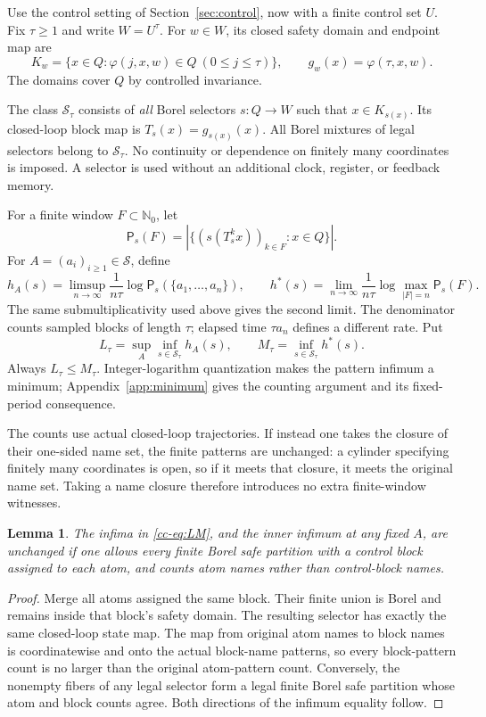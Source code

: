 \documentclass[11pt,reqno]{amsart}
\numberwithin{equation}{section}
\newtheorem{lemma}[theorem]{Lemma}
\theoremstyle{definition}
\newcommand{\Nzero}{\mathbb N_0}
\newcommand{\Patt}{\mathsf P}
\newcommand{\hpat}{h^{*}}
\newcommand{\Ssafe}{\mathcal S}
\begin{document}
Use the control setting of Section~\ref{sec:control}, now with a
finite control set $U$. Fix $\tau\ge1$ and write $W=U^\tau$.
For $w\in W$, its closed safety domain and endpoint map are
\begin{equation}\label{cc-eq:safe}
 K_w=\{x\in Q:\varphi(j,x,w)\in Q\ (0\le j\le\tau)\},
 \qquad g_w(x)=\varphi(\tau,x,w).
\end{equation}
The domains cover $Q$ by controlled invariance.

The class $\Ssafe_\tau$ consists of \emph{all} Borel selectors $s:Q\to W$
such that $x\in K_{s(x)}$. Its closed-loop block map is
$T_s(x)=g_{s(x)}(x)$. All Borel mixtures of legal selectors belong to
$\Ssafe_\tau$. No continuity or dependence on finitely many coordinates
is imposed. A selector is used without an additional clock, register,
or feedback memory.

For a finite window $F\subset\Nzero$, let
\[
 \Patt_s(F)=\left|\{(s(T_s^k x))_{k\in F}:x\in Q\}\right|.
\]
For $A=(a_i)_{i\ge1}\in\mathscr S$, define
\[
 h_A(s)=\limsup_{n\to\infty}\frac{1}{n\tau}
       \log\Patt_s(\{a_1,\ldots,a_n\}),\qquad
 h^*(s)=\lim_{n\to\infty}\frac{1}{n\tau}
       \log\max_{|F|=n}\Patt_s(F).
\]
The same submultiplicativity used above gives the second limit.
The denominator counts sampled blocks of length $\tau$; elapsed
time $\tau a_n$ defines a different rate.
Put
\begin{equation}\label{cc-eq:LM}
 L_\tau=\sup_A\inf_{s\in\Ssafe_\tau}h_A(s),\qquad
 M_\tau=\inf_{s\in\Ssafe_\tau}\hpat(s).
\end{equation}
Always $L_\tau\le M_\tau$. Integer-logarithm quantization makes
the pattern infimum a minimum; Appendix~\ref{app:minimum} gives
the counting argument and its fixed-period consequence.

The counts use actual closed-loop trajectories. If instead one takes
the closure of their one-sided name set, the finite patterns are
unchanged: a cylinder specifying finitely many coordinates is open, so
if it meets that closure, it meets the original name set. Taking a name
closure therefore introduces no extra finite-window witnesses.

\begin{lemma}\label{cc-lem:merge}
The infima in \eqref{cc-eq:LM}, and the inner infimum at any fixed $A$, are
unchanged if one allows every finite Borel safe partition with a
control block assigned to each atom, and counts atom names rather than
control-block names.
\end{lemma}
\begin{proof}
Merge all atoms assigned the same block. Their finite union is Borel
and remains inside that block's safety domain. The resulting selector
has exactly the same closed-loop state map. The map from original atom
names to block names is coordinatewise and onto the actual block-name
patterns, so every block-pattern count is no larger than the original
atom-pattern count. Conversely, the nonempty fibers of any legal
selector form a legal finite Borel safe partition whose atom and
block counts agree. Both directions of the infimum equality follow.
\end{proof}
\end{document}

